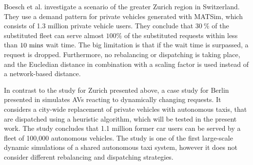 Boesch et al. \cite{boesch2016autonomous} investigate a scenario of the greater
Zurich region in Switzerland. They use a demand pattern for private vehicles
generated with MATSim, which consists of 1.3 million private vehicle users.
They conclude that $30 ~ \%$ of the substituted fleet can serve almost $100 \%$ of the substituted
requests within less than $10 ~ \textnormal{mins}$ wait time. The big limitation
is that if the wait time is surpassed, a request is dropped. Furthermore, no rebalancing
or dispatching is taking place, and the Eucledian distance in combination with a scaling factor is
used instead of a network-based distance. %

In contrast to the study for Zurich presented above, a case study for Berlin
presented in \cite{bischoff2016simulation} simulates AVs reacting to dynamically changing requests.
It considers a city-wide replacement of private vehicles with autonomous taxis, that
are dispatched using a heuristic algorithm, which will be tested in the present work.
 The study concludes that 1.1 million former car users can be served by a fleet
 of 100,000 autonomous vehicles.
The study is one of the first large-scale dynamic
 simulations of a shared autonomous taxi system, however it does not consider
 different rebalancing and dispatching strategies.

